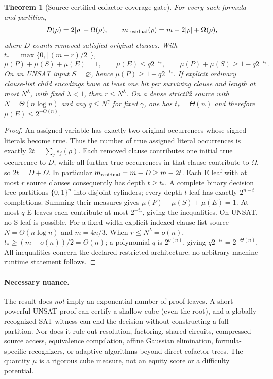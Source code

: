 \documentclass[10pt]{article}
\newtheorem{theorem}{Theorem}
\begin{document}
\begin{theorem}[Source-certified cofactor coverage gate]
For every such formula and partition,
\[
D(\rho)=2|\rho|-\Omega(\rho),\qquad m_{\rm residual}(\rho)=m-2|\rho|+\Omega(\rho),
\]
where $D$ counts removed satisfied original clauses. With $t_* =\max\{0,\lceil(m-r)/2\rceil\}$,
\[
\boxed{\mu(P)+\mu(S)+\mu(E)=1,\qquad
  \mu(E)\le q2^{-t_*},\qquad
  \mu(P)+\mu(S)\ge 1-q2^{-t_*}.}
\]
On an UNSAT input $S=\varnothing$, hence $\mu(P)\ge1-q2^{-t_*}$. If explicit ordinary clause-list child encodings have at least one bit per surviving clause and length at most $N^\lambda$, with fixed $\lambda<1$, then $r\le N^\lambda$. On a dense strict22 source with $N=\Theta(n\log n)$ and any $q\le N^\gamma$ for fixed $\gamma$, one has $t_*=\Theta(n)$ and therefore $\mu(E)\le2^{-\Theta(n)}$.
\end{theorem}
\begin{proof}
An assigned variable has exactly two original occurrences whose signed literals become true. Thus the number of true assigned literal occurrences is exactly $2t=\sum_j s_j(\rho)$. Each removed clause contributes one initial true occurrence to $D$, while all further true occurrences in that clause contribute to $\Omega$, so $2t=D+\Omega$. In particular $m_{\rm residual}=m-D\ge m-2t$. Each E leaf with at most $r$ source clauses consequently has depth $t\ge t_*$. A complete binary decision tree partitions $\{0,1\}^n$ into disjoint cylinders; every depth-$t$ leaf has exactly $2^{n-t}$ completions. Summing their measures gives $\mu(P)+\mu(S)+\mu(E)=1$. At most $q$ E leaves each contribute at most $2^{-t_*}$, giving the inequalities. On UNSAT, no S leaf is possible. For a fixed-width explicit indexed clause-list source $N=\Theta(n\log n)$ and $m=4n/3$. When $r\le N^\lambda=o(n)$, $t_*\ge(m-o(n))/2=\Theta(n)$; a polynomial $q$ is $2^{o(n)}$, giving $q2^{-t_*}=2^{-\Theta(n)}$. All inequalities concern the declared restricted architecture; no arbitrary-machine runtime statement follows.
\end{proof}

\paragraph{Necessary nuance.} The result does \emph{not} imply an exponential number of proof leaves. A short powerful UNSAT proof can certify a shallow cube (even the root), and a globally recognized SAT witness can end the decision without constructing a full partition. Nor does it rule out resolution, factoring, shared circuits, compressed source access, equivalence compilation, affine Gaussian elimination, formula-specific recognizers, or adaptive algorithms beyond direct cofactor trees. The quantity $\mu$ is a rigorous cube measure, not an equity score or a difficulty potential.
\end{document}
